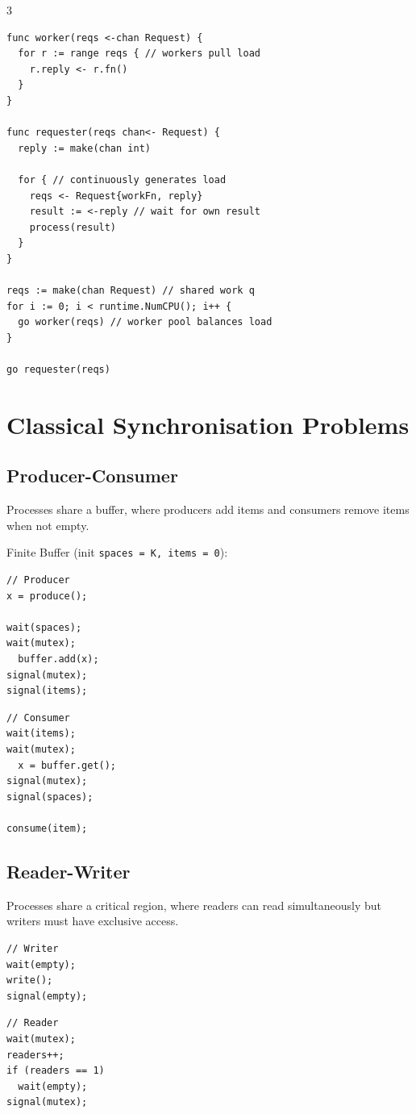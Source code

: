 \documentclass[12pt, a4paper]{article}
\begin{document}
\begin{multicols*}{3}
\begin{lstlisting}[basicstyle=\ttfamily\scriptsize]
func worker(reqs <-chan Request) {
  for r := range reqs { // workers pull load
    r.reply <- r.fn()
  }
}

func requester(reqs chan<- Request) {
  reply := make(chan int)

  for { // continuously generates load
    reqs <- Request{workFn, reply}
    result := <-reply // wait for own result
    process(result)
  }
}

reqs := make(chan Request) // shared work q
for i := 0; i < runtime.NumCPU(); i++ {
  go worker(reqs) // worker pool balances load
}

go requester(reqs)
\end{lstlisting}
\colbreak
\section{Classical Synchronisation Problems}
\lstset{style=c}
\subsection{Producer-Consumer}
Processes share a buffer, where producers add items and
consumers remove items when not empty.

Finite Buffer (init \lstinline|spaces = K, items = 0|):\\
\begin{minipage}{0.45\columnwidth}
  \begin{lstlisting}
// Producer
x = produce();

wait(spaces);
wait(mutex);
  buffer.add(x);
signal(mutex);
signal(items);
  \end{lstlisting}
\end{minipage}
\begin{minipage}{0.5\columnwidth}
  \begin{lstlisting}
// Consumer
wait(items);
wait(mutex);
  x = buffer.get();
signal(mutex);
signal(spaces);

consume(item);
  \end{lstlisting}
\end{minipage}
\vspace{-1em}
\subsection{Reader-Writer}
Processes share a critical region, where readers can read simultaneously but writers must have exclusive access.
\vspace{-1em}
\begin{minipage}{0.45\columnwidth}
  \begin{lstlisting}
// Writer
wait(empty);
write();
signal(empty);
  \end{lstlisting}
\end{minipage}
\begin{minipage}{0.5\columnwidth}
  \begin{lstlisting}
// Reader 
wait(mutex);
readers++;
if (readers == 1)
  wait(empty);
signal(mutex);


\end{lstlisting}
\end{minipage}
\end{multicols*}
\end{document}
